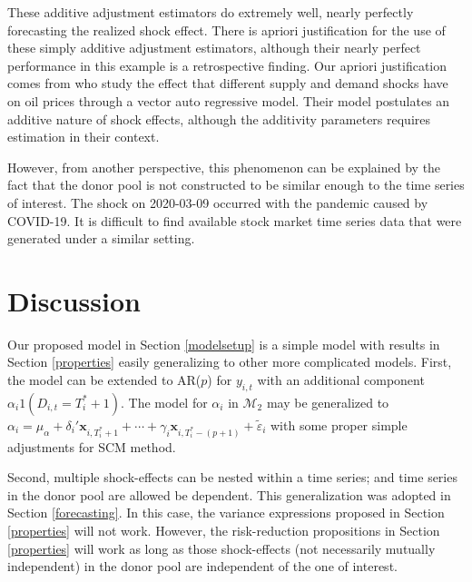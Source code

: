 \documentclass[11pt]{article}
\def\mc#1{\mathcal{#1}} %
\theoremstyle{definition}
\begin{document}
These additive adjustment estimators do extremely well, nearly perfectly forecasting the realized shock effect. There is apriori justification for the use of these simply additive adjustment estimators, although their nearly perfect performance in this example is a retrospective finding. Our apriori justification comes from \citet{kilian2009not} who study the effect that different supply and demand shocks have on oil prices through a vector auto regressive model. Their model postulates an additive nature of shock effects, although the additivity parameters requires estimation in their context. %

However, from another perspective, this phenomenon can be explained by the fact that the donor pool is not constructed to be similar enough to the time series of interest. The shock on 2020-03-09 occurred with the pandemic caused by  COVID-19. It is difficult to find available stock market time series data that were generated under a similar setting.  





\section{Discussion}




Our proposed model in Section \ref{modelsetup} is a simple model with results in Section \ref{properties} easily generalizing to other more complicated models. First, the model can be extended to AR($p$) for $y_{i,t}$ with an additional component $\alpha_i 1(D_{i,t}=T_i^* + 1)$.  The model for $\alpha_i$ in $\mc{M}_2$ may be generalized to $\alpha_i = \mu_{\alpha} + \delta_i' \mathbf{x}_{i, T_i^*+1} + \cdots + \gamma_i \mathbf{x}_{i, T_i^* -(p+1)} + \tilde{\varepsilon}_{i}$ with some proper simple adjustments for SCM method. 

Second, multiple shock-effects can be nested within a time series; and time series in the donor pool are allowed be dependent. This generalization was adopted in Section \ref{forecasting}. In this case, the variance expressions proposed in Section \ref{properties} will not work. However, the risk-reduction propositions in Section \ref{properties} will work  as long as those shock-effects (not necessarily mutually independent) in the donor pool are independent of the one of interest. 
\end{document}
